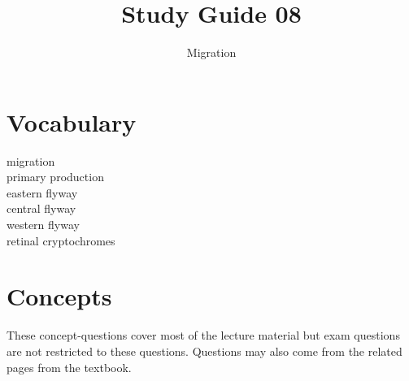 \documentclass[nofonts, letterpaper]{tufte-handout}
\title{Study Guide 08}
\author{Migration}
\date{} %
\begin{document}
\maketitle	%


\section{Vocabulary}
\vspace{-1\baselineskip}
\begin{multicols}{2}
migration \\
primary production \\
eastern flyway \\
central flyway \\
western flyway \\
retinal cryptochromes 
\end{multicols}

\section{Concepts}

These concept-questions cover most of the lecture material but exam questions are not restricted to these questions. Questions may also come from the related pages from the textbook.\vspace{\baselineskip}
\end{document}

